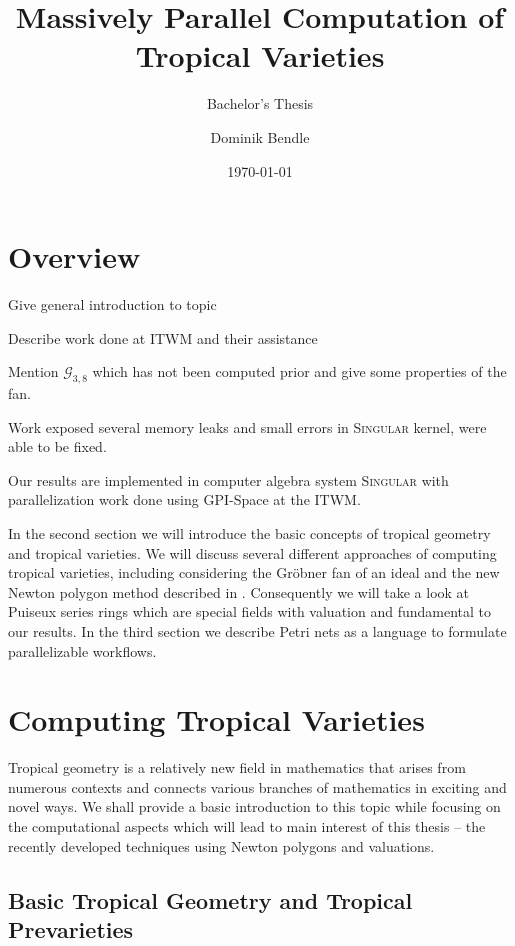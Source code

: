 \documentclass[
  paper=a4,
  DIV=14,
  fontsize=12pt,
  titlepage,
  bibliography=totoc,
  listof=totoc,
  pagesize=pdftex
]{scrartcl}
\title{Massively Parallel Computation of Tropical Varieties}
\subtitle{Bachelor's Thesis}
\author{Dominik Bendle}
\date{\today}
\numberwithin{figure}{section}
\numberwithin{equation}{section}
\numberwithin{table}{section}
\theoremstyle{definition}
\numberwithin{definition}{section}
\begin{document}
\pagestyle{headings}

\maketitle

\tableofcontents
\newpage

\section{Overview}

Give general introduction to topic

Describe work done at ITWM and their assistance

Mention $\mathcal G_{3,8}$ which has not been computed prior and give some properties of the
fan.

Work exposed several memory leaks and small errors in \textsc{Singular} kernel, were able
to be fixed.

Our results are implemented in computer algebra system \textsc{Singular} \cite{Singular}
with parallelization work done using GPI-Space at the ITWM.


In the second section we will introduce the basic concepts of tropical geometry and
tropical varieties. We will discuss several different approaches of computing tropical
varieties, including considering the Gröbner fan of an ideal and the new Newton polygon
method described in \cite{tropPointsLinks}. Consequently we will take a look at Puiseux
series rings which are special fields with valuation and fundamental to our results. In
the third section we describe Petri nets as a language to formulate parallelizable
workflows.


\section{Computing Tropical Varieties}

Tropical geometry is a relatively new field in mathematics that arises from numerous
contexts and connects various branches of mathematics in exciting and novel ways. We shall
provide a basic introduction to this topic while focusing on the computational aspects
which will lead to main interest of this thesis -- the recently developed techniques using
Newton polygons and valuations.

\subsection{Basic Tropical Geometry and Tropical Prevarieties}
\end{document}
